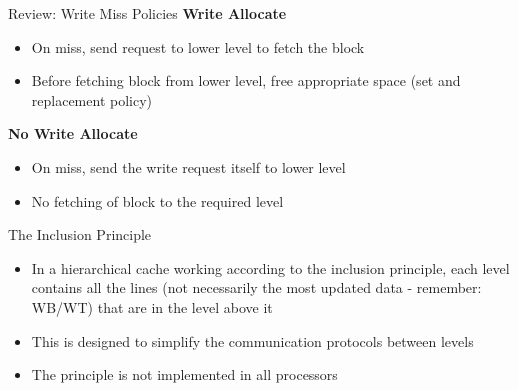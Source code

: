 \documentclass[aspectratio=169,12pt]{beamer}
\begin{document}
\begin{frame}{Review: Write Miss Policies}
\textbf{Write Allocate}
\begin{itemize}
    \item On miss, send request to lower level to fetch the block
    \item Before fetching block from lower level, free appropriate space (set and replacement policy)
\end{itemize}

\textbf{No Write Allocate}
\begin{itemize}
    \item On miss, send the write request itself to lower level
    \item No fetching of block to the required level
\end{itemize}

\begin{center}
\end{center}
\end{frame}

\begin{frame}{The Inclusion Principle}
\begin{itemize}
    \item In a hierarchical cache working according to the inclusion principle, each level contains all the lines (not necessarily the most updated data - remember: WB/WT) that are in the level above it
    \item This is designed to simplify the communication protocols between levels
    \item The principle is not implemented in all processors
\end{itemize}

\begin{center}
\end{center}
\end{frame}
\end{document}
